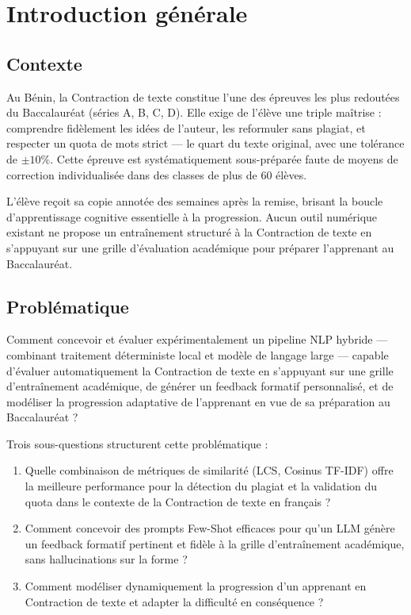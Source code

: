 \chapter*{Introduction générale}

\section*{Contexte}

Au Bénin, la Contraction de texte constitue l'une des épreuves les plus redoutées du Baccalauréat (séries A, B, C, D). Elle exige de l'élève une triple maîtrise : comprendre fidèlement les idées de l'auteur, les reformuler sans plagiat, et respecter un quota de mots strict — le quart du texte original, avec une tolérance de \(\pm10\%\). Cette épreuve est systématiquement sous-préparée faute de moyens de correction individualisée dans des classes de plus de 60 élèves.

L'élève reçoit sa copie annotée des semaines après la remise, brisant la boucle d'apprentissage cognitive essentielle à la progression. Aucun outil numérique existant ne propose un entraînement structuré à la Contraction de texte en s'appuyant sur une grille d'évaluation académique pour préparer l'apprenant au Baccalauréat.

\section*{Problématique}

Comment concevoir et évaluer expérimentalement un pipeline NLP hybride — combinant traitement déterministe local et modèle de langage large — capable d'évaluer automatiquement la Contraction de texte en s'appuyant sur une grille d'entraînement académique, de générer un feedback formatif personnalisé, et de modéliser la progression adaptative de l'apprenant en vue de sa préparation au Baccalauréat ?

Trois sous-questions structurent cette problématique :

\begin{enumerate}
    \item Quelle combinaison de métriques de similarité (LCS, Cosinus TF-IDF) offre la meilleure performance pour la détection du plagiat et la validation du quota dans le contexte de la Contraction de texte en français ?
    \item Comment concevoir des prompts Few-Shot efficaces pour qu'un LLM génère un feedback formatif pertinent et fidèle à la grille d'entraînement académique, sans hallucinations sur la forme ?
    \item Comment modéliser dynamiquement la progression d'un apprenant en Contraction de texte et adapter la difficulté en conséquence ?
\end{enumerate}


